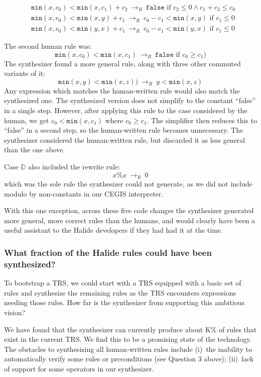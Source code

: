 \documentclass[acmsmall,review,anonymous]{acmart}\settopmatter{printfolios=true,printccs=false,printacmref=false}
\newcommand{\hmin}[0]{\texttt{min}}
\newcommand{\rewrites}[0]{\:\rightarrow_{R}\:}
\newcommand{\pred}[0]{\textrm{ if }}
\newcommand{\hfalse}[0]{\texttt{false}}
\begin{document}
\begin{align*}
& \hmin(x, c_0) < \hmin(x, c_1) + c_2 \rewrites  \hfalse \pred c_2 \leq 0 \wedge c_1 + c_2 \leq c_0 \\
& \hmin(x, c_0) < \hmin(x, y) + c_1 \rewrites c_0 - c_1 < \hmin(x, y) \pred c_1 \leq 0 \\
& \hmin(x, c_0) < \hmin(y, x) + c_1 \rewrites c_0 - c_1 < \hmin(y, x) \pred c_1 \leq 0
\end{align*}

The second human rule was:
\[
\hmin(x, c_0) < \hmin(x, c_1) \rewrites \hfalse \pred c_0 \geq c_1) 
\]
The synthesizer found a more general rule, along with three other commuted variants of it:
\[
\hmin(x, y) < \hmin(x, z)) \rewrites y < \hmin(x, z)
\]
Any expression which matches the human-written rule would also match the synthesized one. The synthesized version does not simplify to the constant “false” in a single step. However, after applying this rule to the case considered by the human, we get $c_0 < \hmin(x, c_1)$ where $c_0 \geq c_1$. The simplifier then reduces this to “false” in a second step, so the human-written rule becomes unnecessary. The synthesizer considered the human-written rule, but discarded it as less general than the one above.

Case $\mathbb{D}$ also included the rewrite rule: 
\[
x \% x \rewrites 0
\]
which was the sole rule the synthesizer could not generate, as we did not include modulo by non-constants in our CEGIS interpreter.

With this one exception, across these five code changes the synthesizer generated more general, more correct rules than the humans, and would clearly have been a useful assistant to the Halide developers if they had had it at the time.


\subsubsection{What fraction of the Halide rules could have been synthesized?}

To bootstrap a TRS, we could start with a TRS equipped with a basic set of rules and synthesize the remaining rules as the TRS encounters expressions needing those rules.  How far is the synthesizer from supporting this ambitious vision?

We have found that the synthesizer can currently produce about K\% of rules that exist in the current TRS. We find this to be a promising state of the technology. The obstacles to synthesizing all human-written rules include (i)~the inability to automatically verify some rules or preconditions (see Question 3 above); (ii)~lack of support for some operators in our synthesizer. 
\end{document}
